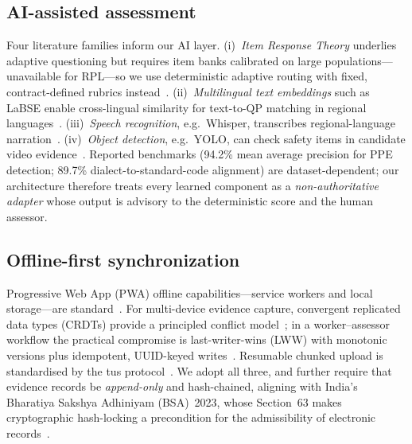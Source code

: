 \documentclass[conference]{IEEEtran}
\begin{document}
\subsection{AI-assisted assessment}
Four literature families inform our AI layer. (i)~\emph{Item Response Theory} underlies
adaptive questioning but requires item banks calibrated on large populations---unavailable
for RPL---so we use deterministic adaptive routing with fixed, contract-defined rubrics
instead~\cite{hambleton_irt}. (ii)~\emph{Multilingual text embeddings} such as LaBSE enable
cross-lingual similarity for text-to-QP matching in regional languages~\cite{labse}.
(iii)~\emph{Speech recognition}, e.g.\ Whisper, transcribes regional-language
narration~\cite{whisper}. (iv)~\emph{Object detection}, e.g.\ YOLO, can check safety items
in candidate video evidence~\cite{yolo}. Reported benchmarks (94.2\% mean average precision
for PPE detection; 89.7\% dialect-to-standard-code alignment) are dataset-dependent; our
architecture therefore treats every learned component as a \emph{non-authoritative adapter}
whose output is advisory to the deterministic score and the human assessor.

\subsection{Offline-first synchronization}
Progressive Web App (PWA) offline capabilities---service workers and local storage---are
standard~\cite{mdn_pwa}. For multi-device evidence capture, convergent replicated data types
(CRDTs) provide a principled conflict model~\cite{shapiro_crdt}; in a worker--assessor
workflow the practical compromise is last-writer-wins (LWW) with monotonic versions plus
idempotent, UUID-keyed writes~\cite{rfc7519}. Resumable chunked upload is standardised by
the tus protocol~\cite{tus}. We adopt all three, and further require that evidence records be
\textit{append-only} and hash-chained, aligning with India's Bharatiya Sakshya Adhiniyam
(BSA)~2023, whose Section~63 makes cryptographic hash-locking a precondition for the
admissibility of electronic records~\cite{bsa_2023}.

\end{document}

